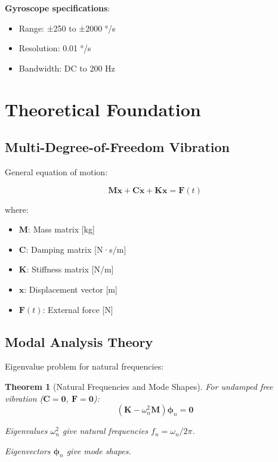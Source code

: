\documentclass[12pt,a4paper]{article}
\newtheorem{theorem}{Theorem}
\begin{document}
\textbf{Gyroscope specifications}:
\begin{itemize}
\item Range: ±250 to ±2000 °/s
\item Resolution: 0.01 °/s
\item Bandwidth: DC to 200 Hz
\end{itemize}

\section{Theoretical Foundation}

\subsection{Multi-Degree-of-Freedom Vibration}

General equation of motion:

\begin{equation}
\mathbf{M}\ddot{\mathbf{x}} + \mathbf{C}\dot{\mathbf{x}} + \mathbf{K}\mathbf{x} = \mathbf{F}(t)
\end{equation}

where:
\begin{itemize}
\item $\mathbf{M}$: Mass matrix [kg]
\item $\mathbf{C}$: Damping matrix [N·s/m]
\item $\mathbf{K}$: Stiffness matrix [N/m]
\item $\mathbf{x}$: Displacement vector [m]
\item $\mathbf{F}(t)$: External force [N]
\end{itemize}

\subsection{Modal Analysis Theory}

Eigenvalue problem for natural frequencies:

\begin{theorem}[Natural Frequencies and Mode Shapes]
For undamped free vibration ($\mathbf{C} = \mathbf{0}$, $\mathbf{F} = \mathbf{0}$):
\begin{equation}
(\mathbf{K} - \omega_n^2 \mathbf{M})\boldsymbol{\phi}_n = \mathbf{0}
\end{equation}

Eigenvalues $\omega_n^2$ give natural frequencies $f_n = \omega_n / 2\pi$.

Eigenvectors $\boldsymbol{\phi}_n$ give mode shapes.
\end{theorem}
\end{document}
